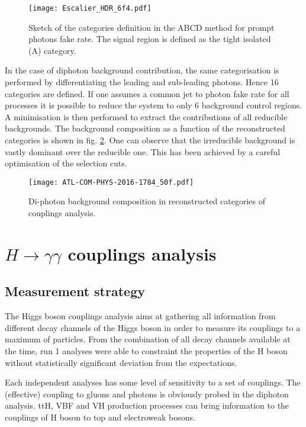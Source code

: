 \begin{figure}[htbp]
\centering
\texttt{[image: Escalier\_HDR\_6f4.pdf]}
\caption{\label{fig:org2dbdc47}
Sketch of the categories definition in the ABCD method for prompt photons fake rate. The signal region is defined as the tight isolated (A) category.\cite{Escalier_HDR}}
\end{figure}

In the case of diphoton background contribution, the same categorisation is performed by differentiating the leading and sub-leading photons.
Hence 16 categories are defined.
If one assumes a common jet to photon fake rate for all processes it is possible to reduce the system to only 6 background control regions.
A minimisation is then performed to extract the contributions of all reducible backgrounds.
The background composition as a function of the reconstructed categories is shown in fig. \ref{fig:org61f8f4a}.
One can observe that the irreducible background is vastly dominant over the reducible one.
This has been achieved by a careful optimisation of the selection cuts.

\begin{figure}[htbp]
\centering
\texttt{[image: ATL-COM-PHYS-2016-1784\_50f.pdf]}
\caption{\label{fig:org61f8f4a}
Di-photon background composition in reconstructed categories of couplings analysis.\cite{ATL-COM-PHYS-2016-1784}}
\end{figure}


\chapter{$H\rightarrow\gamma\gamma$ couplings analysis}
\label{sec:org4860f0b}
\section{Measurement strategy}
\label{sec:org1aa713f}
The Higgs boson couplings analysis aims at gathering all information from different decay channels of the Higgs boson in order to measure its couplings to a maximum of particles.
From the combination of all decay channels available at the time, run 1 analyses \cite{ATLAS-CONF-2013-012,CMS-HIG-14-009,ATLAS-CONF-2014-009,ATLAS-CONF-2014-010,CERN-EP-2016-100} were able to constraint the properties of the H boson without statistically significant deviation from the expectations.

Each independent analyses has some level of sensitivity to a set of couplings.
The (effective) coupling to gluons and photons is obviously probed in the diphoton analysis.
ttH, VBF and VH production processes can bring information to the couplings of H boson to top and electroweak bosons.

